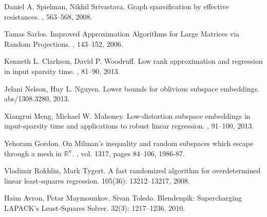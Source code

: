 \documentclass[11pt]{article}
\begin{document}
\begin{thebibliography}{42}

Daniel A. Spielman, Nikhil Srivastava.
\newblock Graph sparsification by effective resistances.
, 563--568, 2008.

Tamas Sarlos.
\newblock Improved Approximation Algorithms for Large Matrices via Random Projections.
, 143--152, 2006.

Kenneth L. Clarkson, David P. Woodruff.
\newblock Low rank approximation and regression in input sparsity time.
, 81--90, 2013.

Jelani Nelson, Huy L. Nguyen.
\newblock Lower bounds for oblivious subspace embeddings.
 abs/1308.3280, 2013.

Xiangrui Meng, Michael W. Mahoney.
\newblock Low-distortion subspace embeddings in input-sparsity time and applications to robust linear regression.
, 91--100, 2013.

Yehoram Gordon. 
\newblock On Milman’s inequality and random subspaces which escape through a mesh in $\mathbb{R}^n$.
, vol. 1317, pages 84--106, 1986-87.

Vladimir Rokhlin, Mark Tygert.
\newblock A fast randomized algorithm for overdetermined linear least-squares regression.
 105(36): 13212--13217, 2008.

Haim Avron, Petar Maymounkov, Sivan Toledo.
\newblock Blendenpik: Supercharging LAPACK's Least-Squares Solver.
 32(3): 1217--1236, 2010.

\end{thebibliography}
\end{document}
